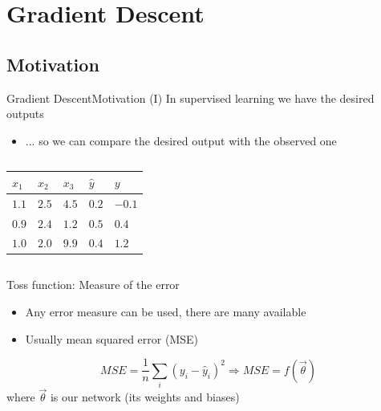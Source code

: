 \documentclass[10pt,compress]{beamer} %
\begin{document}
\section{Gradient Descent}
\subsection{Motivation}

\begin{frame}{Gradient Descent}{Motivation (I)}
    In supervised learning we have the desired outputs
	\begin{itemize}
	\item ... so we can compare the desired output with the observed one
	\end{itemize}

	\begin{columns}[c]
            

            \begin{table}[]
            \centering
            \begin{tabular}{lll|l|l}\hline
		    $x_1$ & $x_2$ & $x_3$ & $\hat{y}$ & $y$ \\
               \hline
              $1.1$ & $2.5$ & $4.5$ & $0.2$ & $-0.1$   \\
              $0.9$ & $2.4$ & $1.2$ & $0.5$ & $0.4$  \\
              $1.0$ & $2.0$ & $9.9$ & $0.4$ & $1.2$ \\\hline
            \end{tabular}
	    \end{table}
    \end{columns}

    \alert{Toss function}: Measure of the error
        \begin{itemize}
		\item Any error measure can be used, there are many available
		\item Usually mean squared error (MSE) 
        \end{itemize}

	\begin{equation*}
		MSE = \frac{1}{n} \sum_i(y_i-\hat{y}_i)^2 \Rightarrow MSE = f(\vec{\theta})
	\end{equation*}
	where $\vec{\theta}$ is our network (its weights and biases)
\end{frame}
\end{document}
